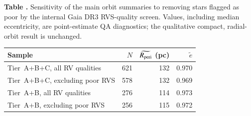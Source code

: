 \begin{center}
\label{tab:rv_quality_sensitivity}
\begin{minipage}{\columnwidth}
\small\textbf{Table \thetable.} Sensitivity of the main orbit summaries to
removing stars flagged as poor by the internal Gaia DR3 RVS-quality screen.
Values, including median eccentricity, are point-estimate QA diagnostics; the qualitative compact,
radial-orbit result is unchanged.
\end{minipage}
\vspace{0.4ex}

\footnotesize
\setlength{\tabcolsep}{3pt}
\begin{tabular}{@{}lrrr@{}}
\hline\hline
Sample & $N$ & $\widetilde{R_{\mathrm{peri}}}$ (pc) & $\tilde e$ \\
\hline
Tier~A+B+C, all RV qualities        & 621 & 132 & 0.970 \\
Tier~A+B+C, excluding poor RVS      & 578 & 132 & 0.969 \\
Tier~A+B, all RV qualities          & 276 & 114 & 0.973 \\
Tier~A+B, excluding poor RVS        & 256 & 115 & 0.972 \\
\hline
\end{tabular}
\end{center}
